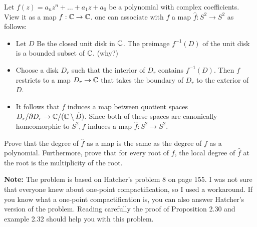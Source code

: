 \begin{problem}

Let $f(z) = a_nz^n + \ldots + a_1z + a_0$ be a polynomial with complex coefficients. View it as a map $f: \mathbb{C}\to \mathbb{C}$. one can associate with $f$ a map $\hat{f}: S^2 \to S^2$ as follows:
\begin{itemize}
  \item Let $D$ Be the closed unit disk in $\mathbb{C}$. The preimage $f^{-1}(D)$ of the unit disk is a bounded subset of $\mathbb{C}$. (why?)
  \item Choose a disk $D_r$ such that the interior of $D_r$ contains $f^{-1}(D)$. Then $f$ restricts to a map $D_r \to \mathbb{C}$ that takes the boundary of $D_r$ to the exterior of $D$.
  \item It follows that $f$ induces a map between quotient spaces $D_r/\partial D_r \to \mathbb{C} / (\mathbb{C} \setminus \dot{D})$. Since both of these spaces are canonically homeomorphic to $S^2,f$ induces a map $\hat{f}: S^2 \to S^2$.
\end{itemize}
  Prove that the degree of $\hat{f}$ as a map is the same as the degree of $f$ as a polynomial. Furthermore, prove that for every root of $f$, the local degree of $\hat{f}$ at the root is the multiplicity of the root.

  \noindent \textbf{Note:} The problem is based on Hatcher's problem 8 on page 155. I was not sure that everyone knew about one-point compactification, so I used a workaround. If you know what a one-point compactification is, you can also answer Hatcher's version of the problem. Reading carefully the proof of Proposition 2.30 and example 2.32 should help you with this problem.

\end{problem}


